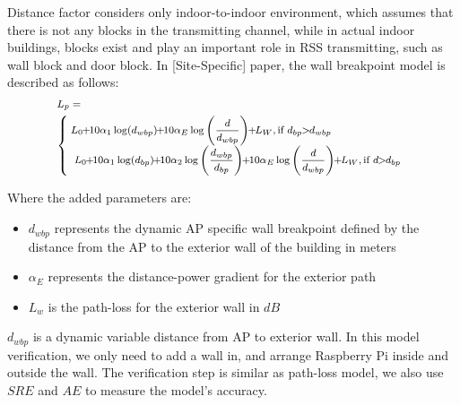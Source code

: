 \documentclass[10pt,conference]{IEEEtran}
\begin{document}
Distance factor considers only indoor-to-indoor environment, which assumes that there is not any blocks in the transmitting channel, while in actual indoor buildings, blocks exist and play an important role in RSS transmitting, such as wall block and door block. In [Site-Specific] paper, the wall breakpoint model is described as follows:
\begin{equation}
\footnotesize{
\begin{gathered}
  {L_p} =  \hfill \\
  \left\{ {\begin{array}{*{20}{l}}
  {{\!\!L_0}\!\!+\!\!10{\alpha _1}\log ({d_{wbp}})\!\!+\!\!10{\alpha _E}\log \left( {\dfrac{d}{{{d_{wbp}}}}} \right)\!\!+\!\!{L_W},{\text{if }}{d_{bp}}\!\!>\!\!{d_{wbp}}} \\ 
  {{L_0}\!\!+\!\!10{\alpha _1}\log ({d_{bp}})\!\!+\!\!10{\alpha _2}\log \left( {\dfrac{{{d_{wbp}}}}{{{d_{bp}}}}} \right)\!\!+\!\!10{\alpha _E}\log \left( {\dfrac{d}{{{d_{wbp}}}}} \right)\!\!+\!\!{L_W},{\text{if }}d\!\!>\!\!{d_{bp}}} 
\end{array}} \right. \hfill \\ 
\end{gathered}
} 
\end{equation}

Where  the added parameters are:
\begin{itemize}
	\item $d_{wbp}$ represents the dynamic AP specific wall breakpoint defined by the distance from the AP to the exterior wall of the building in meters
	\item $\alpha_E$ represents the distance-power gradient for the exterior path
	\item $L_w$ is the path-loss for the exterior wall in $dB$
\end{itemize}

$d_{wbp}$ is a dynamic variable distance from AP to exterior wall. In this model verification, we only need to add a wall in, and arrange Raspberry Pi inside and outside the wall. The verification step is similar as path-loss model, we also use $SRE$ and $AE$ to measure the model's accuracy.

\end{document}
